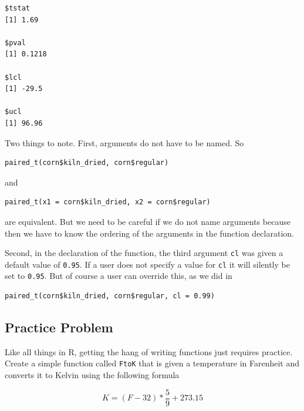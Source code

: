 \documentclass[
]{krantz}
\makeatletter
\newenvironment{Shaded}{\begin{snugshade}}{\end{snugshade}}
\newcommand{\DataTypeTok}[1]{\textcolor[rgb]{0.27,0.27,0.27}{#1}}
\newcommand{\FloatTok}[1]{\textcolor[rgb]{0.06,0.06,0.06}{#1}}
\newcommand{\KeywordTok}[1]{\textcolor[rgb]{0.27,0.27,0.27}{\textbf{#1}}}
\newcommand{\NormalTok}[1]{#1}
\newcommand{\OperatorTok}[1]{\textcolor[rgb]{0.43,0.43,0.43}{\textbf{#1}}}
\newenvironment{kframe}{%
\medskip{}
\setlength{\fboxsep}{.8em}
 \def\at@end@of@kframe{}%
 \ifinner\ifhmode%
  \def\at@end@of@kframe{\end{minipage}}%
  \begin{minipage}{\columnwidth}%
 \fi\fi%
 \def\FrameCommand##1{\hskip\@totalleftmargin \hskip-\fboxsep
 \colorbox{shadecolor}{##1}\hskip-\fboxsep
     \hskip-\linewidth \hskip-\@totalleftmargin \hskip\columnwidth}%
 \MakeFramed {\advance\hsize-\width
   \@totalleftmargin\z@ \linewidth\hsize
   \@setminipage}}%
 {\par\unskip\endMakeFramed%
 \at@end@of@kframe}
\renewenvironment{Shaded}{\begin{kframe}}{\end{kframe}}
\makeatother
\begin{document}
\begin{Shaded}
\end{Shaded}

\begin{verbatim}
$tstat
[1] 1.69

$pval
[1] 0.1218

$lcl
[1] -29.5

$ucl
[1] 96.96
\end{verbatim}

Two things to note. First, arguments do not have to be named. So

\begin{verbatim}
paired_t(corn$kiln_dried, corn$regular)
\end{verbatim}

and

\begin{verbatim}
paired_t(x1 = corn$kiln_dried, x2 = corn$regular)
\end{verbatim}

are equivalent. But we need to be careful if we do not name arguments because then we have to know the ordering of the arguments in the function declaration.

Second, in the declaration of the function, the third argument \texttt{cl} was given a default value of \texttt{0.95}. If a user does not specify a value for \texttt{cl} it will silently be set to \texttt{0.95}. But of course a user can override this, as we did in

\begin{verbatim}
paired_t(corn$kiln_dried, corn$regular, cl = 0.99)
\end{verbatim}

\hypertarget{ch7PP1}{%
\subsection{Practice Problem}\label{ch7PP1}}

Like all things in R, getting the hang of writing functions just requires practice. Create a simple function called \texttt{FtoK} that is given a temperature in Farenheit and converts it to Kelvin using the following formula

\[
K = (F - 32) * \frac{5}{9} + 273.15
\]
\end{document}
